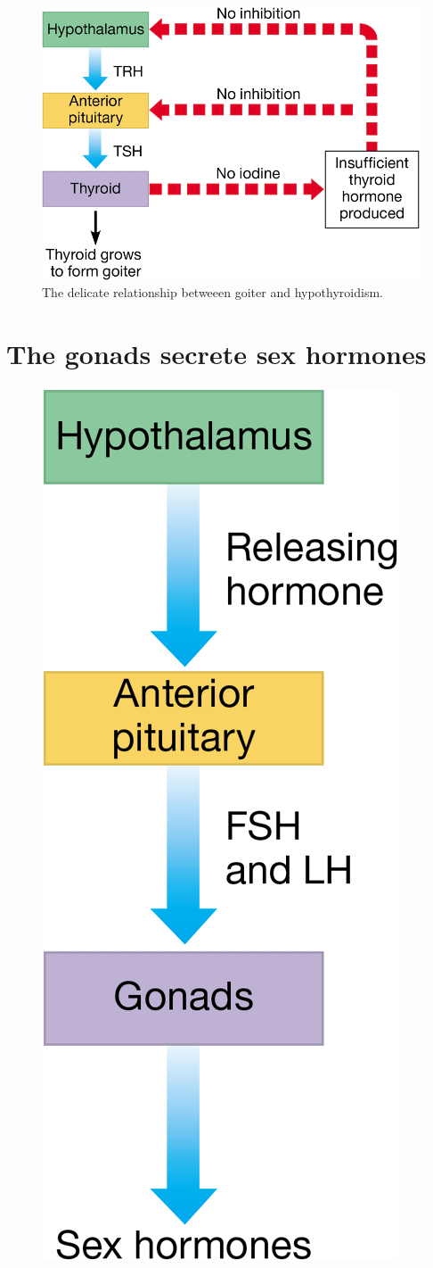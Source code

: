 \documentclass{article}
\begin{document}
\bigbreak{}

\begin{figure}[h]
	\centering
	\includegraphics[width=.8\linewidth]{goiter_thyroid.png}
	\caption{The delicate relationship betweeen goiter and hypothyroidism.}
\end{figure}

\section{The gonads secrete sex hormones}

\begin{figure}
	\centering
	\includegraphics[width=.5\linewidth]{gonads_sex_hormones.png}
\end{figure}
\end{document}
